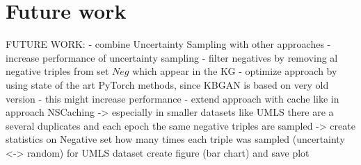 \section{Future work} 
\label{sec:futurework}



FUTURE WORK:
- combine Uncertainty Sampling with other approaches
- increase performance of uncertainty sampling
- filter negatives by removing al negative triples from set $Neg$ which appear in the KG
- optimize approach by using state of the art PyTorch methods, since KBGAN is based on very old version
- this might increase performance
- extend approach with cache like in approach NSCaching 
-> especially in smaller datasets like UMLS  there are a several duplicates and each epoch the same negative triples are sampled
-> create statistics on Negative set how many times each triple was sampled (uncertainty <-> random) for UMLS dataset
create figure (bar chart) and save plot



